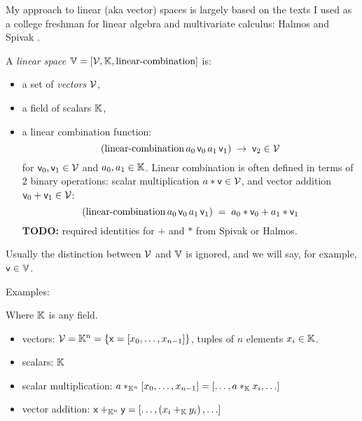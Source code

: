 My approach to linear (aka vector) spaces is largely based on
the texts I used as a college freshman for linear algebra and
multivariate calculus: Halmos \cite{halmos-1958}
and Spivak \cite{spivak-1965}.

\begin{definition}
\bigskip
A \textit{linear space} 
$\mathbb{V} = \left[ \mathcal{V}, \mathbb{K}, \text{linear-combination} \right]$
 is:
\begin{itemize}
  \item a set of \textit{vectors} $\mathcal{V}$,
  \item a field  of scalars $\mathbb{K}$,
  \item a linear combination function: 
\begin{equation}
\left( \text{linear-combination} 
\, a_0 \, \mathsf{v}_0 \, a_1 \, \mathsf{v}_1 \right) \; 
 \rightarrow \; \mathsf{v}_2  \in \mathcal{V}
\end{equation}
for $\mathsf{v}_0, \mathsf{v}_1 \in \mathcal{V} $
and $a_0, a_1 \in \mathbb{K}$.
Linear combination is often defined in terms of
$2$ binary operations:
scalar multiplication $a * \mathsf{v} \in \mathcal{V}$,
and vector addition $\mathsf{v}_0 + \mathsf{v}_1 \in \mathcal{V}$:
\begin{equation}
\left( \text{linear-combination} 
\, a_0 \, \mathsf{v}_0 \, a_1 \, \mathsf{v}_1 \right) \; 
= \; a_0*\mathsf{v}_0 + a_1*\mathsf{v}_1
\end{equation}
\textbf{TODO:} required identities for $+$ and $*$ from Spivak or Halmos.
\end{itemize}
\end{definition}
Usually the distinction between $\mathcal{V}$ and $\mathbb{V}$ 
is ignored, and we will say, for example, 
$\mathsf{v} \in \mathbb{V}$.

Examples:

\begin{example}[$\Space{K}^n$]
Where $\mathbb{K}$ is any field.
\begin{itemize}
  \item vectors:
  $\mathcal{V} = \mathbb{K}^n = \{ \mathsf{x}
  = \left[ x_0, \ldots , x_{n-1} \right] \}$,
  tuples of $n$ elements $x_i \in \mathbb{K}$.
  \item scalars: $\mathbb{K}$
  \item scalar multiplication:
  $ a *_{\mathbb{K}^n} \left[ x_0, \ldots , x_{n-1} \right] =
  \left[ \ldots , a *_{\mathbb{K}} x_{i} , \ldots \right]$
  \item vector addition:
  $\mathsf{x} +_{\mathbb{K}^n} \mathsf{y}
  = \left[ \ldots , \left( x_i +_{\mathbb{K}} y_i \right) ,\ldots \right]$
\end{itemize}
\end{example}

